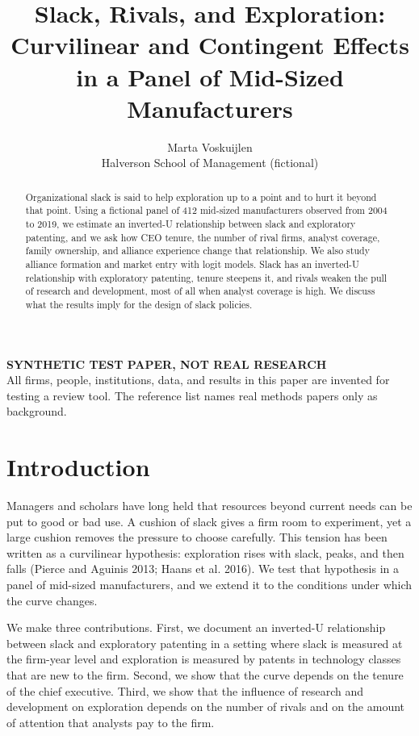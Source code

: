 \documentclass[11pt]{article}
\title{Slack, Rivals, and Exploration: Curvilinear and Contingent Effects in a Panel of Mid-Sized Manufacturers}
\author{Marta Voskuijlen\\ Halverson School of Management (fictional)}
\date{}
\begin{document}
\maketitle
\thispagestyle{fancy}
\begin{center}
{\bfseries SYNTHETIC TEST PAPER, NOT REAL RESEARCH}\\[4pt]
{\small All firms, people, institutions, data, and results in this paper are invented for testing a review tool. The reference list names real methods papers only as background.}
\end{center}

\begin{abstract}
\noindent Organizational slack is said to help exploration up to a point and to hurt it beyond that point. Using a fictional panel of 412 mid-sized manufacturers observed from 2004 to 2019, we estimate an inverted-U relationship between slack and exploratory patenting, and we ask how CEO tenure, the number of rival firms, analyst coverage, family ownership, and alliance experience change that relationship. We also study alliance formation and market entry with logit models. Slack has an inverted-U relationship with exploratory patenting, tenure steepens it, and rivals weaken the pull of research and development, most of all when analyst coverage is high. We discuss what the results imply for the design of slack policies.
\end{abstract}

\section{Introduction}

Managers and scholars have long held that resources beyond current needs can be put to good or bad use. A cushion of slack gives a firm room to experiment, yet a large cushion removes the pressure to choose carefully. This tension has been written as a curvilinear hypothesis: exploration rises with slack, peaks, and then falls (Pierce and Aguinis 2013; Haans et al. 2016). We test that hypothesis in a panel of mid-sized manufacturers, and we extend it to the conditions under which the curve changes.

We make three contributions. First, we document an inverted-U relationship between slack and exploratory patenting in a setting where slack is measured at the firm-year level and exploration is measured by patents in technology classes that are new to the firm. Second, we show that the curve depends on the tenure of the chief executive. Third, we show that the influence of research and development on exploration depends on the number of rivals and on the amount of attention that analysts pay to the firm.
\end{document}

